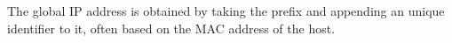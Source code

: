 The global IP address is obtained by taking the prefix and appending an unique identifier to it, often based on the MAC address of the host.
